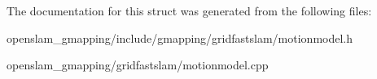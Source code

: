 The documentation for this struct was generated from the following files\+:\begin{DoxyCompactItemize}
\item 
openslam\+\_\+gmapping/include/gmapping/gridfastslam/motionmodel.\+h\item 
openslam\+\_\+gmapping/gridfastslam/motionmodel.\+cpp\end{DoxyCompactItemize}
